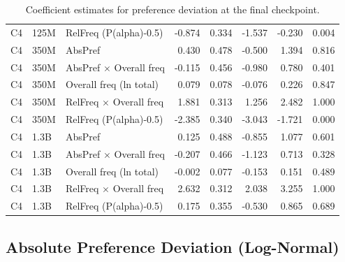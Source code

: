 \documentclass{article}
\begin{document}
\begin{table}[H]
{\begin{tabular}{lllrrrrr}
C4 & 125M & RelFreq (P(alpha)-0.5) & -0.874 & 0.334 & -1.537 & -0.230 & 0.004\\
\addlinespace
C4 & 350M & AbsPref & 0.430 & 0.478 & -0.500 & 1.394 & 0.816\\
C4 & 350M & AbsPref $\times$ Overall freq & -0.115 & 0.456 & -0.980 & 0.780 & 0.401\\
C4 & 350M & Overall freq (ln total) & 0.079 & 0.078 & -0.076 & 0.226 & 0.847\\
C4 & 350M & RelFreq $\times$ Overall freq & 1.881 & 0.313 & 1.256 & 2.482 & 1.000\\
C4 & 350M & RelFreq (P(alpha)-0.5) & -2.385 & 0.340 & -3.043 & -1.721 & 0.000\\
\addlinespace
C4 & 1.3B & AbsPref & 0.125 & 0.488 & -0.855 & 1.077 & 0.601\\
C4 & 1.3B & AbsPref $\times$ Overall freq & -0.207 & 0.466 & -1.123 & 0.713 & 0.328\\
C4 & 1.3B & Overall freq (ln total) & -0.002 & 0.077 & -0.153 & 0.151 & 0.489\\
C4 & 1.3B & RelFreq $\times$ Overall freq & 2.632 & 0.312 & 2.038 & 3.255 & 1.000\\
C4 & 1.3B & RelFreq (P(alpha)-0.5) & 0.175 & 0.355 & -0.530 & 0.865 & 0.689\\
\bottomrule
\end{tabular}

}

\caption{\label{tbl-sg-final}Coefficient estimates for preference
deviation at the final checkpoint.}

\end{table}%

\clearpage

\subsection{Absolute Preference Deviation
(Log-Normal)}\label{absolute-preference-deviation-log-normal}
\end{document}
